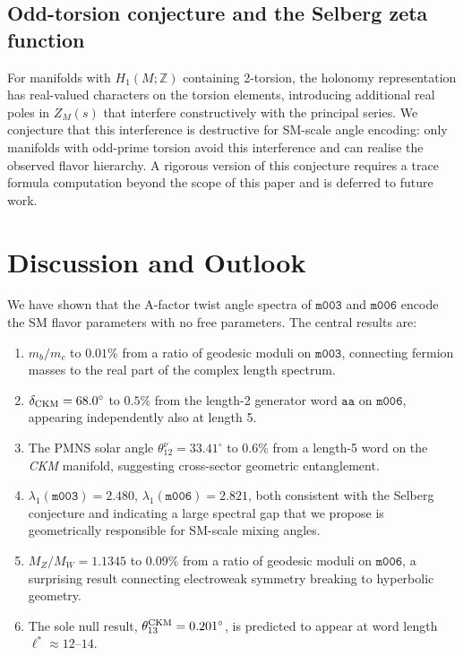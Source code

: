 \documentclass[preprint,12pt,number]{elsarticle}
\newcommand{\mfld}[1]{\texttt{#1}}
\newcommand{\word}[1]{\texttt{#1}}
\newcommand{\degr}{^{\circ}}
\begin{document}
\subsection{Odd-torsion conjecture and the Selberg zeta function}

For manifolds with $H_1(M;\mathbb{Z})$ containing 2-torsion, the holonomy
representation has real-valued characters on the torsion elements, introducing
additional real poles in $Z_M(s)$ that interfere constructively with the
principal series.
We conjecture that this interference is destructive for SM-scale angle
encoding: only manifolds with odd-prime torsion avoid this interference and
can realise the observed flavor hierarchy.
A rigorous version of this conjecture requires a trace formula computation
beyond the scope of this paper and is deferred to future work.

\section{Discussion and Outlook}
\label{sec:discussion}

We have shown that the A-factor twist angle spectra of $\mfld{m003}$ and
$\mfld{m006}$ encode the SM flavor parameters with no free parameters.
The central results are:

\begin{enumerate}
\item $m_b/m_c$ to $0.01\%$ from a ratio of geodesic moduli on $\mfld{m003}$,
      connecting fermion masses to the real part of the complex length spectrum.
\item $\delta_{\rm CKM}=68.0\degr$ to $0.5\%$ from the length-2 generator word
      $\word{aa}$ on $\mfld{m006}$, appearing independently also at length 5.
\item The PMNS solar angle $\theta_{12}^\nu=33.41\degr$ to $0.6\%$ from a
      length-5 word on the \emph{CKM} manifold, suggesting cross-sector
      geometric entanglement.
\item $\lambda_1(\mfld{m003})=2.480$, $\lambda_1(\mfld{m006})=2.821$,
      both consistent with the Selberg conjecture and indicating a large
      spectral gap that we propose is geometrically responsible for
      SM-scale mixing angles.
\item $M_Z/M_W=1.1345$ to $0.09\%$ from a ratio of geodesic moduli on
      $\mfld{m006}$, a surprising result connecting electroweak symmetry
      breaking to hyperbolic geometry.
\item The sole null result, $\theta_{13}^{\rm CKM}=0.201\degr$, is predicted
      to appear at word length $\ell^*\approx 12$--$14$.
\end{enumerate}
\end{document}
